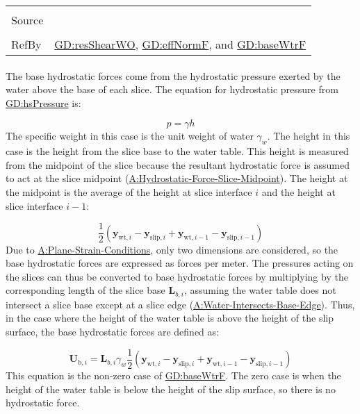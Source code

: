 \documentclass[12pt]{article}
\begin{document}
\begin{minipage}{\textwidth}
\begin{tabular}{>{\raggedright}p{}>{\raggedright\arraybackslash}p{}}
\\ \midrule \\
Source & \cite{fredlund1977}
         
\\ \midrule \\
RefBy & \hyperref[GD:resShearWO]{GD:resShearWO}, \hyperref[GD:effNormF]{GD:effNormF}, and \hyperref[GD:baseWtrF]{GD:baseWtrF}
        
\\ \bottomrule
\end{tabular}
\end{minipage}
\paragraph{}
\label{GD:baseWtrFDeriv}
The base hydrostatic forces come from the hydrostatic pressure exerted by the water above the base of each slice. The equation for hydrostatic pressure from \hyperref[GD:hsPressure]{GD:hsPressure} is:

\begin{displaymath}
p=γ h
\end{displaymath}
The specific weight in this case is the unit weight of water ${γ_{w}}$. The height in this case is the height from the slice base to the water table. This height is measured from the midpoint of the slice because the resultant hydrostatic force is assumed to act at the slice midpoint (\hyperref[assumpHFSM]{A:Hydrostatic-Force-Slice-Midpoint}). The height at the midpoint is the average of the height at slice interface $i$ and the height at slice interface $i-1$:

\begin{displaymath}
\frac{1}{2} \left({\symbf{y}_{\text{wt},i}}-{\symbf{y}_{\text{slip},i}}+{\symbf{y}_{\text{wt},i-1}}-{\symbf{y}_{\text{slip},i-1}}\right)
\end{displaymath}
Due to \hyperref[assumpPSC]{A:Plane-Strain-Conditions}, only two dimensions are considered, so the base hydrostatic forces are expressed as forces per meter. The pressures acting on the slices can thus be converted to base hydrostatic forces by multiplying by the corresponding length of the slice base ${\symbf{L}_{b,i}}$, assuming the water table does not intersect a slice base except at a slice edge (\hyperref[assumpWIBE]{A:Water-Intersects-Base-Edge}). Thus, in the case where the height of the water table is above the height of the slip surface, the base hydrostatic forces are defined as:

\begin{displaymath}
{\symbf{U}_{\text{b},i}}={\symbf{L}_{b,i}} {γ_{w}} \frac{1}{2} \left({\symbf{y}_{\text{wt},i}}-{\symbf{y}_{\text{slip},i}}+{\symbf{y}_{\text{wt},i-1}}-{\symbf{y}_{\text{slip},i-1}}\right)
\end{displaymath}
This equation is the non-zero case of \hyperref[GD:baseWtrF]{GD:baseWtrF}. The zero case is when the height of the water table is below the height of the slip surface, so there is no hydrostatic force.
\end{document}
